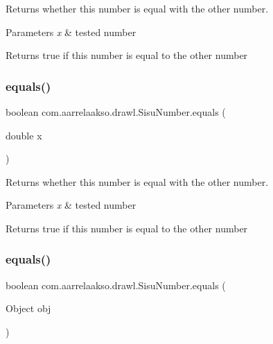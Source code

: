 Returns whether this number is equal with the other number. 


\begin{DoxyParams}{Parameters}
{\em x} & tested number \\
\hline
\end{DoxyParams}
\begin{DoxyReturn}{Returns}
true if this number is equal to the other number 
\end{DoxyReturn}
\mbox{\label{classcom_1_1aarrelaakso_1_1drawl_1_1_sisu_number_a96f08f16d1a09dbbf49bd8cf59cc6c41}} 
\subsubsection{\texorpdfstring{equals()}{equals()}\hspace{0.1cm}{\footnotesize\ttfamily [2/3]}}
{\footnotesize\ttfamily boolean com.\+aarrelaakso.\+drawl.\+Sisu\+Number.\+equals (\begin{DoxyParamCaption}\item[{double}]{x }\end{DoxyParamCaption})\hspace{0.3cm}{\ttfamily [protected]}}



Returns whether this number is equal with the other number. 


\begin{DoxyParams}{Parameters}
{\em x} & tested number \\
\hline
\end{DoxyParams}
\begin{DoxyReturn}{Returns}
true if this number is equal to the other number 
\end{DoxyReturn}
\mbox{\label{classcom_1_1aarrelaakso_1_1drawl_1_1_sisu_number_a8f5579e8b2e077ead4147751e7ab27ce}} 
\subsubsection{\texorpdfstring{equals()}{equals()}\hspace{0.1cm}{\footnotesize\ttfamily [3/3]}}
{\footnotesize\ttfamily boolean com.\+aarrelaakso.\+drawl.\+Sisu\+Number.\+equals (\begin{DoxyParamCaption}\item[{Object}]{obj }\end{DoxyParamCaption})}



